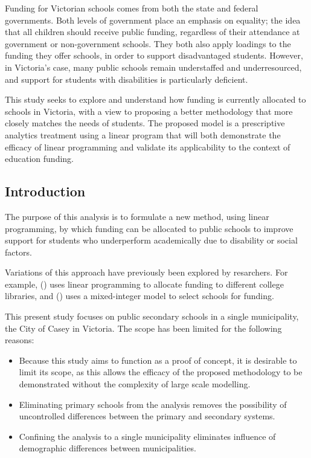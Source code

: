 \documentclass[11pt, a4paper]{article}
\begin{document}
    Funding for Victorian schools comes from both the state and federal governments. Both levels of government place an emphasis on equality; the idea that all children should receive public funding, regardless of their attendance at government or non-government schools. They both also apply loadings to the funding they offer schools, in order to support disadvantaged students. However, in Victoria's case, many public schools remain understaffed and underresourced, and support for students with disabilities is particularly deficient. 

    This study seeks to explore and understand how funding is currently allocated to schools in Victoria, with a view to proposing a better methodology that more closely matches the needs of students. The proposed model is a prescriptive analytics treatment using a linear program that will both demonstrate the efficacy of linear programming and validate its applicability to the context of education funding.

    \subsection{Introduction} \label{intro}

    The purpose of this analysis is to formulate a new method, using linear programming, by which funding can be allocated to public schools to improve support for students who underperform academically due to disability or social factors.

    Variations of this approach have previously been explored by resarchers. For example,  () uses linear programming to allocate funding to different college libraries, and  () uses a mixed-integer model to select schools for funding. 
    
    This present study focuses on public secondary schools in a single municipality, the City of Casey in Victoria. The scope has been limited for the following reasons:

    \begin{itemize}
        \item Because this study aims to function as a proof of concept, it is desirable to limit its scope, as this allows the efficacy of the proposed methodology to be demonstrated without the complexity of large scale modelling.
        \item Eliminating primary schools from the analysis removes the possibility of uncontrolled differences between the primary and secondary systems.
        \item Confining the analysis to a single municipality eliminates influence of demographic differences between municipalities.  
    \end{itemize}
\end{document}
